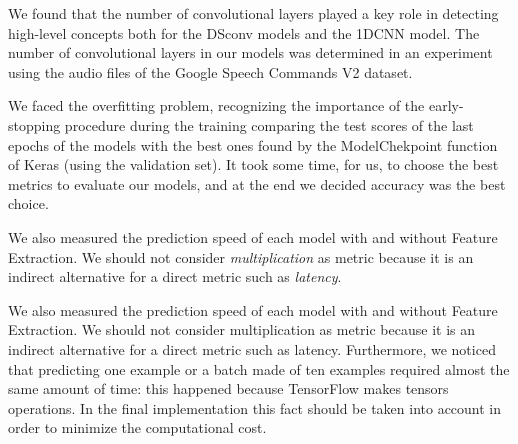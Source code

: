\documentclass[conference]{IEEEtran}
\begin{document}
We found that the number of convolutional layers played a key role in detecting high-level concepts both for the DSconv models and the 1DCNN model. The number of convolutional layers in our models was determined in an experiment using the audio files of the Google Speech Commands V2 dataset.

We faced the overfitting problem, recognizing the importance of the early-stopping procedure during the training comparing the test scores of the last epochs of the models with the best ones found by the ModelChekpoint function of Keras (using the validation set).
It took some time, for us, to choose the best metrics to evaluate our models, and at the end we decided accuracy was the best choice. 

We also measured the prediction speed of each model with and without Feature Extraction. We should not consider \textit{multiplication} as metric because it is an indirect alternative for a direct metric such as \textit{latency}.

We also measured the prediction speed of each model with and without Feature Extraction. We should not consider multiplication as metric because it is an indirect alternative for a direct metric such as latency.
Furthermore, we noticed that predicting one example or a batch made of ten examples required almost the same amount of time: this happened because TensorFlow makes tensors operations. In the final implementation this fact should be taken into account in order to minimize the computational cost.
\end{document}
